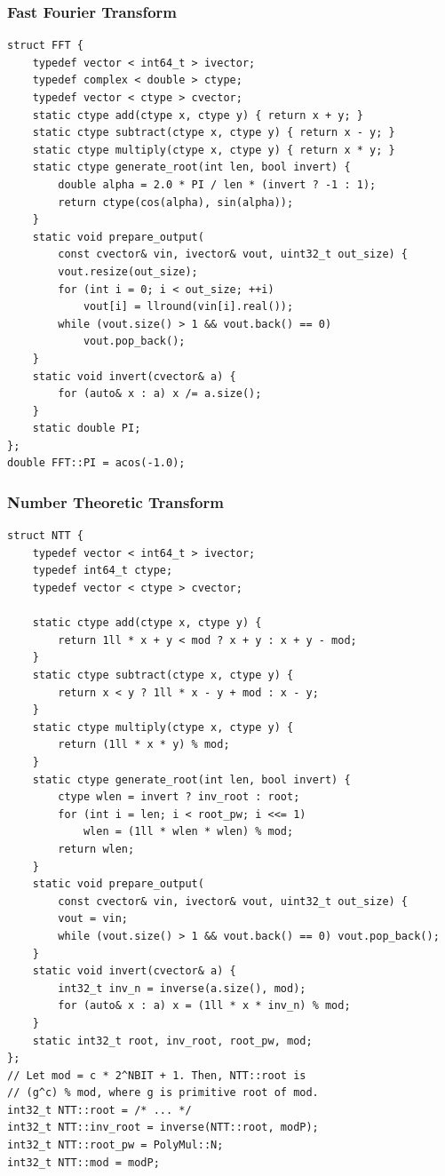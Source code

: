 \documentclass[10pt,letterpaper,landscape]{article}
\begin{document}
\begin{multicols}{2}
\subsubsection{Fast Fourier Transform}
\begin{lstlisting}
struct FFT {
    typedef vector < int64_t > ivector;
    typedef complex < double > ctype;
    typedef vector < ctype > cvector;
    static ctype add(ctype x, ctype y) { return x + y; }
    static ctype subtract(ctype x, ctype y) { return x - y; }
    static ctype multiply(ctype x, ctype y) { return x * y; }
    static ctype generate_root(int len, bool invert) {
        double alpha = 2.0 * PI / len * (invert ? -1 : 1);
        return ctype(cos(alpha), sin(alpha));
    }
    static void prepare_output(
        const cvector& vin, ivector& vout, uint32_t out_size) {
        vout.resize(out_size);
        for (int i = 0; i < out_size; ++i)
            vout[i] = llround(vin[i].real());
        while (vout.size() > 1 && vout.back() == 0)
            vout.pop_back();
    }
    static void invert(cvector& a) {
        for (auto& x : a) x /= a.size();
    }
    static double PI;
};
double FFT::PI = acos(-1.0);
\end{lstlisting}
\subsubsection{Number Theoretic Transform}
\begin{lstlisting}
struct NTT {
    typedef vector < int64_t > ivector;
    typedef int64_t ctype;
    typedef vector < ctype > cvector;

    static ctype add(ctype x, ctype y) { 
        return 1ll * x + y < mod ? x + y : x + y - mod;
    }
    static ctype subtract(ctype x, ctype y) { 
        return x < y ? 1ll * x - y + mod : x - y;
    }
    static ctype multiply(ctype x, ctype y) {
        return (1ll * x * y) % mod;
    }
    static ctype generate_root(int len, bool invert) {
        ctype wlen = invert ? inv_root : root;
        for (int i = len; i < root_pw; i <<= 1)
            wlen = (1ll * wlen * wlen) % mod;
        return wlen;
    }
    static void prepare_output(
        const cvector& vin, ivector& vout, uint32_t out_size) {
        vout = vin;
        while (vout.size() > 1 && vout.back() == 0) vout.pop_back();
    }
    static void invert(cvector& a) {
        int32_t inv_n = inverse(a.size(), mod);
        for (auto& x : a) x = (1ll * x * inv_n) % mod;
    }
    static int32_t root, inv_root, root_pw, mod;
};
// Let mod = c * 2^NBIT + 1. Then, NTT::root is
// (g^c) % mod, where g is primitive root of mod.
int32_t NTT::root = /* ... */
int32_t NTT::inv_root = inverse(NTT::root, modP);
int32_t NTT::root_pw = PolyMul::N;
int32_t NTT::mod = modP;
\end{lstlisting}

\end{multicols}
\end{document}
